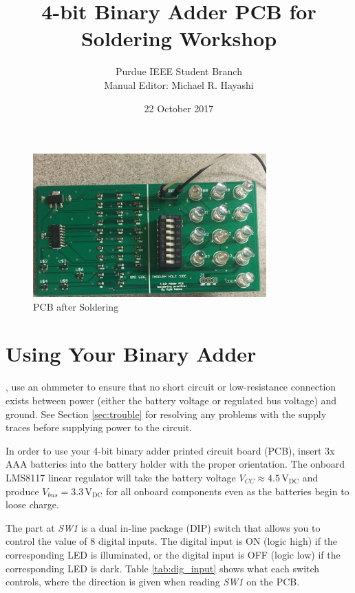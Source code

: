 \documentclass[11pt,oneside]{article}
\title{4-bit Binary Adder PCB for Soldering Workshop}
\author{Purdue IEEE Student Branch \\ Manual Editor: Michael R. Hayashi}
\date{22 October 2017}
\begin{document}
\maketitle
\tableofcontents

\begin{figure}[!htbp]
	\centering
	\includegraphics[width=0.8\textwidth,height=0.3\textheight,keepaspectratio]{Populated_PCB}
	\caption{PCB after Soldering}
	\label{fig:populated}
\end{figure}

\section{Using Your Binary Adder}
\label{sec:using}

\textbf{\color{IEEE-red}{Before powering on your populated printed circuit board}}, use an ohmmeter to ensure that no short circuit or low-resistance connection exists between power (either the battery voltage or regulated bus voltage) and ground. See Section \ref{sec:trouble} for resolving any problems with the supply traces before supplying power to the circuit.

In order to use your 4-bit binary adder printed circuit board (PCB), insert 3x AAA batteries into the battery holder with the proper orientation. The onboard LMS8117 linear regulator will take the battery voltage $V_{CC} \approx 4.5 \, \mathrm{V_{DC}}$ and produce $V_{bus} = 3.3 \, \mathrm{V_{DC}}$ for all onboard components even as the batteries begin to loose charge.

The part at \textit{SW1} is a dual in-line package (DIP) switch that allows you to control the value of 8 digital inputs. The digital input is ON (logic high) if the corresponding LED is illuminated, or the digital input is OFF (logic low) if the corresponding LED is dark. Table \ref{tab:dig_input} shows what each switch controls, where the direction is given when reading \textit{SW1} on the PCB.
\end{document}
